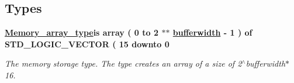 \subsection*{Types}
 \begin{DoxyCompactItemize}
\item 
\hypertarget{classADC__buffer_1_1Behavioral_a658e2166090ca64ce974029de2840027}{{\bfseries \hyperlink{classADC__buffer_1_1Behavioral_a658e2166090ca64ce974029de2840027}{Memory\-\_\-array\-\_\-type}{\bfseries \textcolor{vhdlkeyword}{is}\textcolor{vhdlchar}{ }\textcolor{vhdlchar}{ }\textcolor{vhdlkeyword}{array}\textcolor{vhdlchar}{ }\textcolor{vhdlchar}{(}\textcolor{vhdlchar}{ } \textcolor{vhdldigit}{0} \textcolor{vhdlchar}{ }\textcolor{vhdlchar}{ }\textcolor{vhdlchar}{ }\textcolor{vhdlkeyword}{to}\textcolor{vhdlchar}{ }\textcolor{vhdlchar}{ }\textcolor{vhdlchar}{ } \textcolor{vhdldigit}{2} \textcolor{vhdlchar}{ }\textcolor{vhdlchar}{$\ast$}\textcolor{vhdlchar}{$\ast$}\textcolor{vhdlchar}{ }{\bfseries \hyperlink{classADC__buffer_a2f94b7b31a8914ee23be5e000f89e921}{bufferwidth}} \textcolor{vhdlchar}{ }\textcolor{vhdlchar}{-\/}\textcolor{vhdlchar}{ } \textcolor{vhdldigit}{1} \textcolor{vhdlchar}{ }\textcolor{vhdlchar}{)}\textcolor{vhdlchar}{ }\textcolor{vhdlchar}{ }\textcolor{vhdlkeyword}{of}\textcolor{vhdlchar}{ }\textcolor{comment}{S\-T\-D\-\_\-\-L\-O\-G\-I\-C\-\_\-\-V\-E\-C\-T\-O\-R}\textcolor{vhdlchar}{ }\textcolor{vhdlchar}{(}\textcolor{vhdlchar}{ }\textcolor{vhdlchar}{ } \textcolor{vhdldigit}{15} \textcolor{vhdlchar}{ }\textcolor{vhdlchar}{ }\textcolor{vhdlchar}{ }\textcolor{vhdlkeyword}{downto}\textcolor{vhdlchar}{ }\textcolor{vhdlchar}{ }\textcolor{vhdlchar}{ } \textcolor{vhdldigit}{0} \textcolor{vhdlchar}{ }}} }\label{classADC__buffer_1_1Behavioral_a658e2166090ca64ce974029de2840027}

\begin{DoxyCompactList}\small\item\em The memory storage type. The type creates an array of a size of 2$^\wedge$bufferwidth$\ast$16. \end{DoxyCompactList}\end{DoxyCompactItemize}
